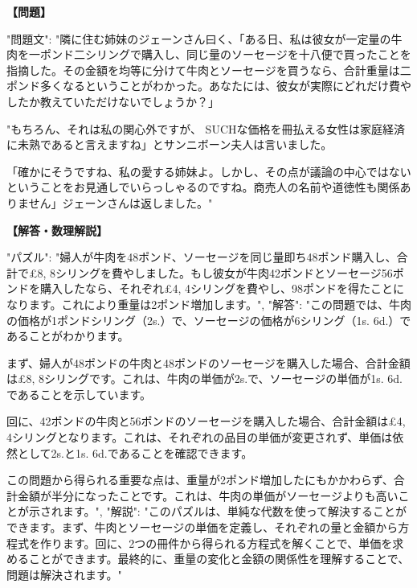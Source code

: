 \documentclass[10pt,a4paper,oneside,openany]{ltjsbook}
\begin{document}
\begin{tcolorbox}[colback=softblue,colframe=primaryblue,title=\textbf{第 20 問：BEEF AND SAUSAGES.},arc=2mm,boxrule=1pt,breakable]
\textbf{【問題】}\par\vspace{0.3em}
{
  "問題文": "隣に住む姉妹のジェーンさん曰く、「ある日、私は彼女が一定量の牛肉を一ポンド二シリングで購入し、同じ量のソーセージを十八便で買ったことを指摘した。その金額を均等に分けて牛肉とソーセージを買うなら、合計重量は二ポンド多くなるということがわかった。あなたには、彼女が実際にどれだけ費やしたか教えていただけないでしょうか？」

  "もちろん、それは私の関心外ですが、 SUCHな価格を冊払える女性は家庭経済に未熟であると言えますね」とサンニボーン夫人は言いました。

  「確かにそうですね、私の愛する姉妹よ。しかし、その点が議論の中心ではないということをお見通しでいらっしゃるのですね。商売人の名前や道徳性も関係ありません」ジェーンさんは返しました。"
}
\tcblower
\textbf{【解答・数理解説】}\par\vspace{0.3em}
{
"パズル": "婦人が牛肉を48ポンド、ソーセージを同じ量即ち48ポンド購入し、合計で£8, 8シリングを費やしました。もし彼女が牛肉42ポンドとソーセージ56ポンドを購入したなら、それぞれ£4, 4シリングを費やし、98ポンドを得たことになります。これにより重量は2ポンド増加します。",
"解答": "この問題では、牛肉の価格が1ポンドシリング（2s.）で、ソーセージの価格が6シリング（1s. 6d.）であることがわかります。

まず、婦人が48ポンドの牛肉と48ポンドのソーセージを購入した場合、合計金額は£8, 8シリングです。これは、牛肉の単価が2s.で、ソーセージの単価が1s. 6d.であることを示しています。

回に、42ポンドの牛肉と56ポンドのソーセージを購入した場合、合計金額は£4, 4シリングとなります。これは、それぞれの品目の単価が変更されず、単価は依然として2s.と1s. 6d.であることを確認できます。

この問題から得られる重要な点は、重量が2ポンド増加したにもかかわらず、合計金額が半分になったことです。これは、牛肉の単価がソーセージよりも高いことが示されます。",
"解説": "このパズルは、単純な代数を使って解決することができます。まず、牛肉とソーセージの単価を定義し、それぞれの量と金額から方程式を作ります。回に、2つの冊件から得られる方程式を解くことで、単価を求めることができます。最終的に、重量の変化と金額の関係性を理解することで、問題は解決されます。"
}
\end{tcolorbox}
\end{document}
